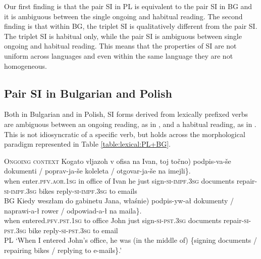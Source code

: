 \documentclass[output=paper,colorlinks,citecolor=brown]{langscibook}
\begin{document}
Our first finding is that the pair SI in PL is equivalent to the pair SI in BG and it is ambiguous between the single ongoing and habitual reading. The second finding is that within BG, the triplet SI is qualitatively different from the pair SI. The triplet SI is habitual only, while the pair SI is ambiguous between single ongoing and habitual reading. This means that the properties of SI are not uniform across languages and even within the same language they are not homogeneous. %







\subsection{Pair SI in Bulgarian and Polish}\label{section:pair-SI-in-BG-and-PL}


Both in Bulgarian and in Polish, SI forms derived from lexically prefixed verbs are ambiguous between an ongoing reading, as in , and a habitual reading, as in . This is not idiosyncratic of a specific verb, but holds across the morphological paradigm represented in Table \ref{table:lexical:PL+BG}. 


\ea \label{ongoing:pair:BG+PL:past} \textsc{Ongoing context}
\ea 	\gll Kogato 	vljazoh v 		ofisa 	  na Ivan, 	 toj  \minsp{(} točno)\hspace{2.4cm}	\minsp{\{} podpis-va-še	dokumenti / poprav-ja-še koleleta / otgovar-ja-še na imejli\}.	\\
%
when 		enter.\textsc{pfv.aor.1sg} 	in office  of Ivan 	
he {} just {} sign-\textsc{si}-\textsc{impf.3sg}	documents {} repair-\textsc{si}-\textsc{impf.3sg} bikes {} reply-\textsc{si}-\textsc{impf.3sg} to emails\\\hfill BG
%
%
\ex  \gll	Kiedy weszłam do gabinetu Jana, \minsp{(} właśnie)\hspace{2.4cm} \minsp{\{} podpis-yw-ał dokumenty / naprawi-a-ł rower / odpowiad-a-ł na maila\}.\\
%
when 	entered.\textsc{pfv.pst.1sg} 	to office 	John {} just {} sign-\textsc{si}-\textsc{pst.3sg}	documents {} repair-\textsc{si}-\textsc{pst.3sg} bike {} reply-\textsc{si}-\textsc{pst.3sg} to email\\ \hfill PL
%
\glt `When I entered John’s office, he was (in the middle of) \{signing documents / repairing bikes / replying to e-mails\}.'
\z
\z
\end{document}
